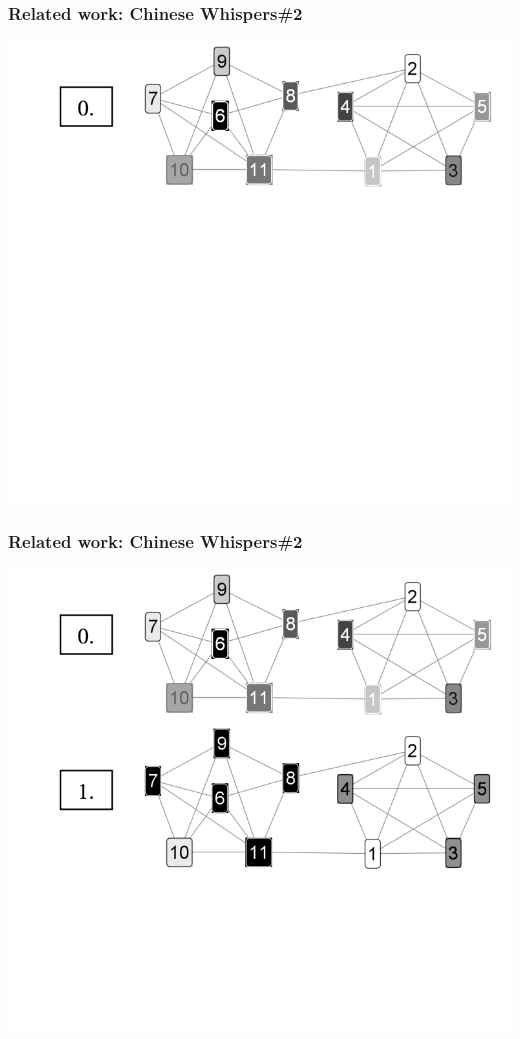 \begin{frame}[fragile]
\frametitle{Related work: Chinese Whispers\#2}
\begin{center}
 \includegraphics[height=0.59\textwidth]{cw2-1}
 
 \end{center}
\end{frame}


\begin{frame}[fragile]
\frametitle{Related work: Chinese Whispers\#2}
\begin{center}
 \includegraphics[height=0.59\textwidth]{cw2-2}
 
 \end{center}
\end{frame}

